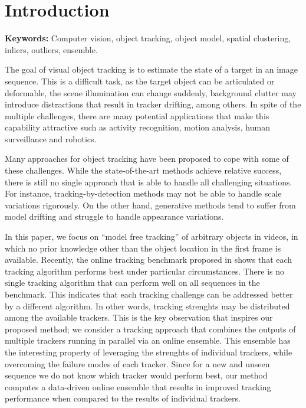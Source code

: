 
\chapter{Introduction} %

\label{chapter::introduction} 


\textbf{Keywords: }Computer vision, object tracking, object model, spatial
clustering, inliers, outliers, ensemble.

The goal of visual object tracking is to estimate the state of a target in an
image sequence.
This is a difficult task, as the target object can be articulated or
deformable, the scene illumination can change suddenly, background
clutter may introduce distractions that result in tracker drifting,
among others. In spite of the multiple challenges, there are many potential
applications that make this capability attractive such as
activity recognition, motion analysis, human surveillance and robotics.

Many approaches for object tracking have been proposed to cope with some of
these challenges.
While the state-of-the-art methods achieve relative success,
there is still no single approach that is able to handle all challenging
situations.
For instance, tracking-by-detection methods may not be able to handle scale
variations rigorously.
On the other hand, generative methods tend to suffer from model drifting and
struggle to handle appearance variations.

In this paper, we focus on ``model free tracking'' of
arbitrary objects in videos, in which no prior knowledge other than
the object location in the first frame is available.
Recently, the online tracking benchmark proposed in \cite{Wu2013B}
shows that
each tracking algorithm performs best under particular circumstances.
There is no single tracking algorithm that can perform well on all
sequences in the benchmark. This indicates that each tracking challenge
can be addressed better by a different algorithm. In other words,
tracking strenghts may be distributed among the available trackers.
This is the key observation that inspires our proposed method;
we consider a tracking approach that combines the outputs
of multiple trackers running in parallel via an online ensemble.
This ensemble has the interesting property of leveraging the strenghts
of individual trackers, while overcoming the failure modes of
each  tracker. Since for a new and unseen sequence we do
not know which tracker would perform best, our method computes
a data-driven online ensemble that results in improved tracking performance
when compared to the results of individual trackers.

